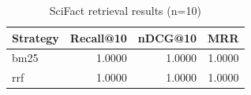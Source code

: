 \begin{table}[h]
\centering
\begin{tabular}{lrrr}
\toprule
Strategy & Recall@10 & nDCG@10 & MRR \\
\midrule
bm25 & 1.0000 & 1.0000 & 1.0000 \\
rrf & 1.0000 & 1.0000 & 1.0000 \\
\bottomrule
\end{tabular}
\caption{SciFact retrieval results (n=10)}
\end{table}

